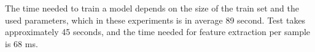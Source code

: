 The time needed to train a model depends on the size of the train set and the used parameters, which in these experiments is in average
89 second.
Test takes approximately 45 seconds, and the time needed for feature extraction per sample is 68 ms.


% 
% 
% 
% 
% 
% 
% 
% 

